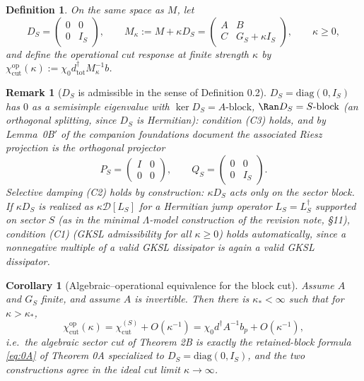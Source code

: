 \documentclass[11pt]{article}
\newtheorem{corollary}[theorem]{Corollary}
\newtheorem{definition}[theorem]{Definition}
\newtheorem{remark}[theorem]{Remark}
\begin{document}
\begin{definition}
On the same space as $M$, let
\[
D_S=\begin{pmatrix}0&0\\0&I_S\end{pmatrix},
\qquad
M_\kappa:=M+\kappa D_S=\begin{pmatrix}A&B\\ C&G_S+\kappa I_S\end{pmatrix},
\qquad \kappa\ge0,
\]
and define the \emph{operational} cut response at finite strength
$\kappa$ by $\chi_{\mathrm{cut}}^{\mathrm{op}}(\kappa):=\chi_0d_{\mathrm{tot}}^\dagger M_\kappa^{-1}b$.
\end{definition}

\begin{remark}[$D_S$ is admissible in the sense of Definition 0.2]
\label{rem:admissible}
$D_S=\mathrm{diag}(0,I_S)$ has $0$ as a semisimple eigenvalue with
$\ker D_S=A\text{-block}$, $\Ran D_S=S\text{-block}$ (an orthogonal
splitting, since $D_S$ is Hermitian): condition (C3) holds, and by
Lemma~0B$'$ of the companion foundations document the associated Riesz
projection is the orthogonal projector
\[
P_S=\begin{pmatrix}I&0\\0&0\end{pmatrix},
\qquad
Q_S=\begin{pmatrix}0&0\\0&I_S\end{pmatrix}.
\]
Selective damping (C2) holds by construction: $\kappa D_S$ acts only on
the sector block. If $\kappa D_S$ is realized as $\kappa\mathcal D[L_S]$
for a Hermitian jump operator $L_S=L_S^\dagger$ supported on sector $S$
(as in the minimal $\Lambda$-model construction of the revision note,
\S11), condition (C1) (GKSL admissibility for all $\kappa\ge0$) holds
automatically, since a nonnegative multiple of a valid GKSL dissipator is
again a valid GKSL dissipator.
\end{remark}

\begin{corollary}[Algebraic--operational equivalence for the block cut]
\label{cor:U1}
Assume $A$ and $G_S$ finite, and assume $A$ is invertible. Then there is
$\kappa_*<\infty$ such that for $\kappa>\kappa_*$,
\[
\chi_{\mathrm{cut}}^{\mathrm{op}}(\kappa)
=\chi_{\mathrm{cut}}^{(S)}+O(\kappa^{-1})
=\chi_0 d^\dagger A^{-1}b_p+O(\kappa^{-1}),
\]
i.e.\ the algebraic sector cut of Theorem 2B is exactly the retained-block
formula \eqref{eq:0A} of Theorem 0A specialized to $D_S=\mathrm{diag}(0,I_S)$,
and the two constructions agree in the ideal cut limit $\kappa\to\infty$.
\end{corollary}
\end{document}
